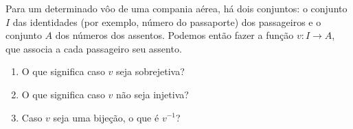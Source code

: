 Para um determinado vôo de uma compania aérea, há dois conjuntos: o conjunto $I$ das identidades
(por exemplo, número do passaporte) dos passageiros e o conjunto $A$ dos números dos assentos.
Podemos então fazer a função $v:I\rightarrow A$, que associa a cada passageiro seu assento.
\begin{enumerate}
	\item O que significa caso $v$ seja sobrejetiva?
	\item O que significa caso $v$ não seja injetiva?
	\item Caso $v$ seja uma bijeção, o que é $v^{-1}$?
\end{enumerate}
